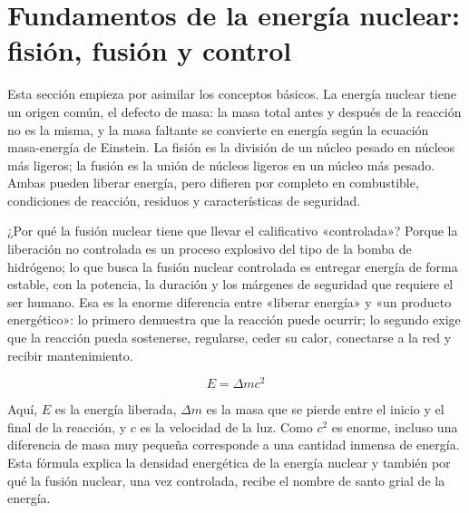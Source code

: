 \section{Fundamentos de la energía nuclear: fisión, fusión y control}

Esta sección empieza por asimilar los conceptos básicos. La energía nuclear tiene un origen común, el defecto de masa: la masa total antes y después de la reacción no es la misma, y la masa faltante se convierte en energía según la ecuación masa-energía de Einstein. La fisión es la división de un núcleo pesado en núcleos más ligeros; la fusión es la unión de núcleos ligeros en un núcleo más pesado. Ambas pueden liberar energía, pero difieren por completo en combustible, condiciones de reacción, residuos y características de seguridad.

¿Por qué la fusión nuclear tiene que llevar el calificativo «controlada»? Porque la liberación no controlada es un proceso explosivo del tipo de la bomba de hidrógeno; lo que busca la fusión nuclear controlada es entregar energía de forma estable, con la potencia, la duración y los márgenes de seguridad que requiere el ser humano. Esa es la enorme diferencia entre «liberar energía» y «un producto energético»: lo primero demuestra que la reacción puede ocurrir; lo segundo exige que la reacción pueda sostenerse, regularse, ceder su calor, conectarse a la red y recibir mantenimiento.

\[
E=\Delta m c^2
\]

Aquí, $E$ es la energía liberada, $\Delta m$ es la masa que se pierde entre el inicio y el final de la reacción, y $c$ es la velocidad de la luz. Como $c^2$ es enorme, incluso una diferencia de masa muy pequeña corresponde a una cantidad inmensa de energía. Esta fórmula explica la densidad energética de la energía nuclear y también por qué la fusión nuclear, una vez controlada, recibe el nombre de santo grial de la energía.

